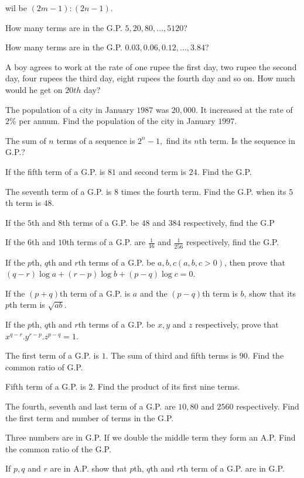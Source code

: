   wil be $(2m - 1):(2n -1)$.
\item How many terms are in the G.P. $5, 20, 80, ..., 5120$?
\item How many terms are in the G.P. $0.03, 0.06, 0.12, \ldots, 3.84$?
\item A boy agrees to work at the rate of one rupee the first day, two rupee the second day, four rupees the third day, eight
  rupees the fourth day and so on. How much would he get on $20th$ day?
\item The population of a city in January $1987$ was $20,000$. It increased at the rate of $2\%$ per annum. Find the population of
  the city in January $1997$.
\item The sum of $n$ terms of a sequence is $2^n - 1,$ find its $n$th term. Is the sequence in G.P.?
\item If the fifth term of a G.P. is $81$ and second term is $24$. Find the G.P.
\item The seventh term of a G.P. is $8$ times the fourth term. Find the G.P. when its $5$th term is $48$.
\item If the $5$th and $8$th terms of a G.P. be $48$ and $384$ respectively, find the G.P
\item If the $6$th and $10$th terms of a G.P. are $\frac{1}{16}$ and $\frac{1}{256}$ respectively, find the G.P.
\item If the $p$th, $q$th and $r$th terms of a G.P. be $a, b, c (a, b, c >0)$, then prove that $(q - r)\log a + (r - p)\log b + (p
  - q)\log c = 0$.
\item If the $(p + q)$th term of a G.P. is $a$ and the $(p - q)$th term is $b$, show that its $p$th term is $\sqrt{ab}$.
\item If the $p$th, $q$th and $r$th terms of a G.P. be $x, y$ and $z$ respectively, prove that $x^{q - r}.y^{r - p}.z^{p - q} = 1$.
\item The first term of a G.P. is $1$. The sum of third and fifth terms is $90$. Find the common ratio of G.P.
\item Fifth term of a G.P. is $2$. Find the product of its first nine terms.
\item The fourth, seventh and last term of a G.P. are $10, 80$ and $2560$ respectively. Find the first term and number of terms in
  the G.P.
\item Three numbers are in G.P. If we double the middle term they form an A.P. Find the common ratio of the G.P.
\item If $p, q$ and $r$ are in A.P. show that $p$th, $q$th and $r$th term of a G.P. are in G.P.
